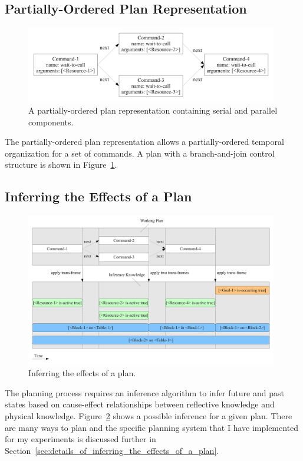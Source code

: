 \subsection{Partially-Ordered Plan Representation}

\begin{figure}[bth]
  \center
  \includegraphics[width=11cm]{gfx/serial_and_parallel_plan}
  \caption[A partially-ordered plan with serial and parallel
    components]{A partially-ordered plan representation containing
    serial and parallel components.}
  \label{fig:serial_and_parallel_plan}
\end{figure}

The partially-ordered plan representation allows a partially-ordered
temporal organization for a set of commands.  A plan with a
branch-and-join control structure is shown in
Figure~\ref{fig:serial_and_parallel_plan}.


\subsection{Inferring the Effects of a Plan}
\label{sec:inferring_the_effects_of_a_plan}

\begin{figure}[bth]
  \center
  \includegraphics[width=11cm]{gfx/infer_plan_effects}
  \caption[Inferring the effects of a plan]{Inferring the effects of
    a plan.}
  \label{fig:infer_plan_effects}
\end{figure}

The planning process requires an inference algorithm to infer future
and past states based on cause-effect relationships between reflective
knowledge and physical knowledge.  Figure~\ref{fig:infer_plan_effects}
shows a possible inference for a given plan.  There are many ways to
plan and the specific planning system that I have implemented for my
experiments is discussed further in
Section~\ref{sec:details_of_inferring_the_effects_of_a_plan}.


